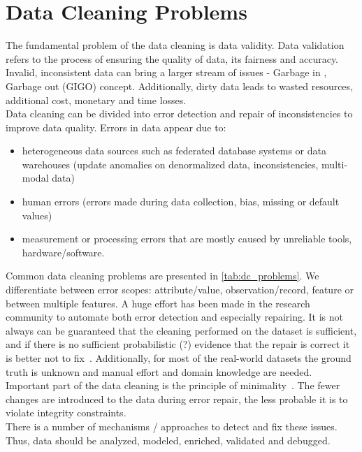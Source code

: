 \section{Data Cleaning Problems}

The fundamental problem of the data cleaning is data validity. Data validation refers to the process of ensuring the quality of data, its fairness and accuracy. 
Invalid, inconsistent data can bring a larger stream of issues - Garbage in , Garbage out (GIGO) concept.
Additionally, dirty data leads to wasted resources, additional cost, monetary and time losses.
\\Data cleaning can be divided into error detection and repair of inconsistencies to improve data quality.
Errors in data appear due to:
\begin{itemize}
    \item heterogeneous data sources such as federated database systems or data warehouses (update anomalies on denormalized data, inconsistencies, multi-modal data)
    \item human errors (errors made during data collection, bias, missing or default values) 
    \item measurement or processing errors that are mostly caused by unreliable tools, hardware/software.
\end{itemize}

Common data cleaning problems are presented in \ref*{tab:dc_problems}. We differentiate between error scopes: attribute/value, observation/record, feature or between multiple features. 
A huge effort has been made in the research community to automate both error detection and especially repairing. 
It is not always can be guaranteed that the cleaning performed on the dataset is sufficient, and if there is no sufficient probabilistic (?) evidence that the repair is correct it is better not to fix~\cite{holoclean}. 
Additionally, for most of the real-world datasets the ground truth is unknown and manual effort and domain knowledge are needed.\\
Important part of the data cleaning is the principle of minimality~\cite{minimality, holoclean}. The fewer changes are introduced to the data during error repair, the less probable it is to violate integrity constraints.
\\There is a number of mechanisms / approaches to detect and fix these issues. %
Thus, data should be analyzed, modeled, enriched, validated and debugged.


